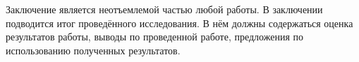 \Conclusion

Заключение является неотъемлемой частью любой работы. В заключении подводится итог проведённого исследования. В нём должны содержаться оценка результатов работы, выводы по проведенной работе, предложения по использованию полученных результатов.
